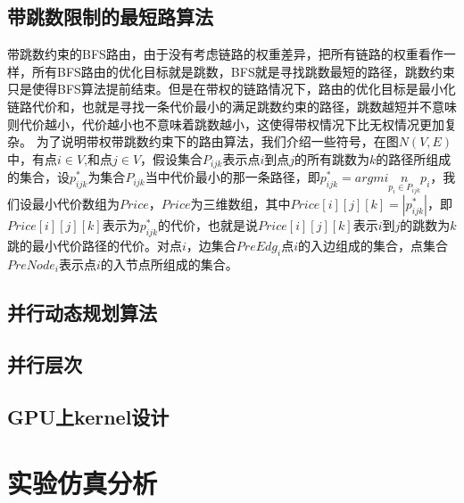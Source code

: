 \subsection{带跳数限制的最短路算法}
  带跳数约束的BFS路由，由于没有考虑链路的权重差异，把所有链路的权重看作一样，所有BFS路由的优化目标就是跳数，BFS就是寻找跳数最短的路径，跳数约束只是使得BFS算法提前结束。但是在带权的链路情况下，路由的优化目标是最小化链路代价和，也就是寻找一条代价最小的满足跳数约束的路径，跳数越短并不意味则代价越小，代价越小也不意味着跳数越小，这使得带权情况下比无权情况更加复杂。
  为了说明带权带跳数约束下的路由算法，我们介绍一些符号，在图$N(V,E)$中，有点$i \in V$,和点$j \in V$，假设集合$P_{ijk}$表示点$i$到点$j$的所有跳数为$k$的路径所组成的集合，设$p_{ijk}^*$为集合$P_{ijk}$当中代价最小的那一条路径，即$p_{ijk}^* =arg min\limits_{p_i \in P_{ijk}}{p_i}$，我们设最小代价数组为$Price$，$Price$为三维数组，其中$Price[i][j][k]=|p_{ijk}^*|$，即$Price[i][j][k]$表示为$p_{ijk}^*$的代价，也就是说$Price[i][j][k]$表示$i$到$j$的跳数为$k$跳的最小代价路径的代价。对点$i$，边集合$PreEdg_i$点$i$的入边组成的集合，点集合$PreNode_i$表示点$i$的入节点所组成的集合。
\subsection{并行动态规划算法}
\subsection{并行层次}
\subsection{GPU上kernel设计}
\section{实验仿真分析}